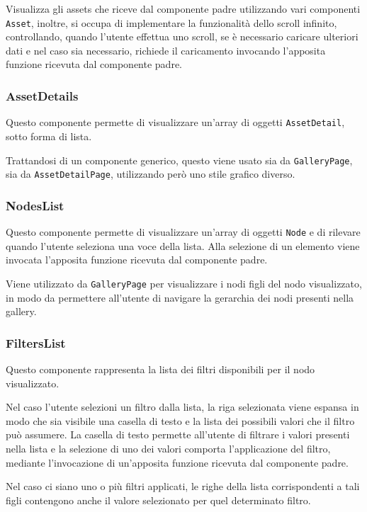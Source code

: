 Visualizza gli assets che riceve dal componente padre utilizzando vari componenti \texttt{Asset}, inoltre, si occupa di implementare la funzionalità dello scroll infinito, controllando, quando l'utente effettua uno scroll, se è necessario caricare ulteriori dati e nel caso sia necessario, richiede il caricamento invocando l'apposita funzione ricevuta dal componente padre.

\subsubsection{AssetDetails}

Questo componente permette di visualizzare un'array di oggetti \texttt{AssetDetail}, sotto forma di lista.

Trattandosi di un componente generico, questo viene usato sia da \texttt{GalleryPage}, sia da \texttt{AssetDetailPage}, utilizzando però uno stile grafico diverso.

\subsubsection{NodesList}

Questo componente permette di visualizzare un'array di oggetti \texttt{Node} e di rilevare quando l'utente seleziona una voce della lista.
Alla selezione di un elemento viene invocata l'apposita funzione ricevuta dal componente padre.

Viene utilizzato da \texttt{GalleryPage} per visualizzare i nodi figli del nodo visualizzato, in modo da permettere all'utente di navigare la gerarchia dei nodi presenti nella gallery.
 
\subsubsection{FiltersList}

Questo componente rappresenta la lista dei filtri disponibili per il nodo visualizzato.

Nel caso l'utente selezioni un filtro dalla lista, la riga selezionata viene espansa in modo che sia visibile una casella di testo e la lista dei possibili valori che il filtro può assumere.
La casella di testo permette all'utente di filtrare i valori presenti nella lista e la selezione di uno dei valori comporta l'applicazione del filtro, mediante l'invocazione di un'apposita funzione ricevuta dal componente padre.

Nel caso ci siano uno o più filtri applicati, le righe della lista corrispondenti a tali figli contengono anche il valore selezionato per quel determinato filtro.

